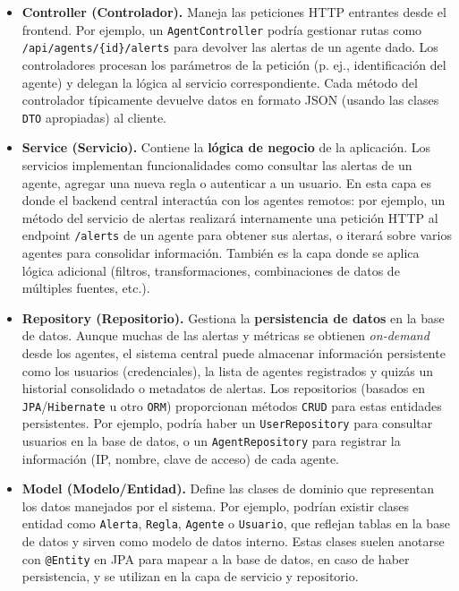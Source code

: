 \documentclass[11pt,a4paper,twoside]{report}
\begin{document}
\begin{itemize}
	\item \textbf{Controller (Controlador).} Maneja las peticiones HTTP entrantes desde el frontend. Por ejemplo, un \texttt{AgentController} podría gestionar rutas como \texttt{/api/agents/\{id\}/alerts} para devolver las alertas de un agente dado. Los controladores procesan los parámetros de la petición (p. ej., identificación del agente) y delegan la lógica al servicio correspondiente. Cada método del controlador típicamente devuelve datos en formato JSON (usando las clases \texttt{DTO} apropiadas) al cliente.
	
	\item \textbf{Service (Servicio).} Contiene la \textbf{lógica de negocio} de la aplicación. Los servicios implementan funcionalidades como consultar las alertas de un agente, agregar una nueva regla o autenticar a un usuario. En esta capa es donde el backend central interactúa con los agentes remotos: por ejemplo, un método del servicio de alertas realizará internamente una petición HTTP al endpoint \texttt{/alerts} de un agente para obtener sus alertas, o iterará sobre varios agentes para consolidar información. También es la capa donde se aplica lógica adicional (filtros, transformaciones, combinaciones de datos de múltiples fuentes, etc.).
	
	\item \textbf{Repository (Repositorio).} Gestiona la \textbf{persistencia de datos} en la base de datos. Aunque muchas de las alertas y métricas se obtienen \textit{on-demand} desde los agentes, el sistema central puede almacenar información persistente como los usuarios (credenciales), la lista de agentes registrados y quizás un historial consolidado o metadatos de alertas. Los repositorios (basados en \texttt{JPA}/\texttt{Hibernate} u otro \texttt{ORM}) proporcionan métodos \texttt{CRUD} para estas entidades persistentes. Por ejemplo, podría haber un \texttt{UserRepository} para consultar usuarios en la base de datos, o un \texttt{AgentRepository} para registrar la información (IP, nombre, clave de acceso) de cada agente.
	
	\item \textbf{Model (Modelo/Entidad).} Define las clases de dominio que representan los datos manejados por el sistema. Por ejemplo, podrían existir clases entidad como \texttt{Alerta}, \texttt{Regla}, \texttt{Agente} o \texttt{Usuario}, que reflejan tablas en la base de datos y sirven como modelo de datos interno. Estas clases suelen anotarse con \texttt{@Entity} en JPA para mapear a la base de datos, en caso de haber persistencia, y se utilizan en la capa de servicio y repositorio.
	

\end{itemize}
\end{document}
